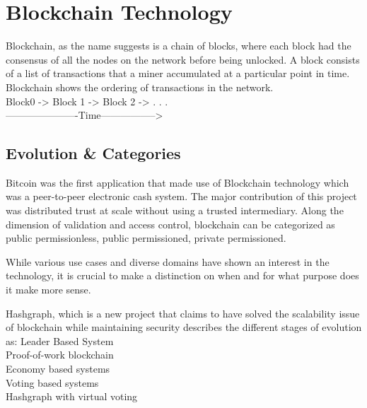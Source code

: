 

\section{Blockchain Technology}
Blockchain, as the name suggests is a chain of blocks, where each block had the
consensus of all the nodes on the network before being unlocked. A block
consists of a list of transactions that a miner accumulated at a particular
point in time. Blockchain shows the ordering of transactions in the network.\\

Block0 -> Block 1 -> Block 2 -> . . . \\
----------------------Time-----------------> 




\subsection{Evolution \& Categories}
Bitcoin was the first application that made use of Blockchain technology which
was a peer-to-peer electronic cash system. The major contribution of this
project was distributed trust at scale without using a trusted intermediary.
Along the dimension of validation and access control, blockchain can be
categorized as public permissionless, public permissioned, private
permissioned. 


While various use cases and diverse domains have shown an interest in the
technology, it is crucial to make a distinction on when and for what purpose
does it make more sense.

Hashgraph, which is a new project that claims to have solved the scalability issue of blockchain while maintaining security describes the different stages of evolution as:
Leader Based System \\
Proof-of-work blockchain \\
Economy based systems \\
Voting based systems \\
Hashgraph with virtual voting \\

